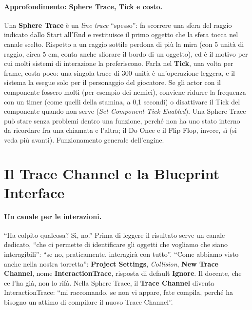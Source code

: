 \paragraph{Approfondimento: Sphere Trace, Tick e costo.} Una \textbf{Sphere Trace} è un
\emph{line trace} ``spesso'': fa scorrere una sfera del raggio indicato dallo Start
all'End e restituisce il primo oggetto che la sfera tocca nel canale scelto. Rispetto a un
raggio sottile perdona di più la mira (con 5 unità di raggio, circa 5 cm, conta anche
sfiorare il bordo di un oggetto), ed è il motivo per cui molti sistemi di interazione la
preferiscono. Farla nel \textbf{Tick}, una volta per frame, costa poco: una singola trace di
300 unità è un'operazione leggera, e il sistema la esegue solo per il personaggio del
giocatore. Se gli actor con il componente fossero molti (per esempio dei nemici), conviene
ridurre la frequenza con un timer (come quelli della stamina, a 0,1 secondi) o disattivare
il Tick del componente quando non serve (\emph{Set Component Tick Enabled}). Una Sphere
Trace può stare senza problemi dentro una funzione, perché non ha uno stato interno da
ricordare fra una chiamata e l'altra; il Do Once e il Flip Flop, invece, sì (si veda più
avanti). Funzionamento generale dell'engine.

\section{Il Trace Channel e la Blueprint Interface}
\label{ue12:sec:bpi}

\paragraph{Un canale per le interazioni.} ``Ha colpito qualcosa? Sì, no.'' Prima di
leggere il risultato serve un canale dedicato, ``che ci permette di identificare gli
oggetti che vogliamo che siano interagibili'': ``se no, praticamente, interagirà con
tutto''. ``Come abbiamo visto anche nella nostra torretta'': \textbf{Project Settings},
\emph{Collision}, \textbf{New Trace Channel}, nome \textbf{InteractionTrace}, risposta di
default \textbf{Ignore}. Il docente, che ce l'ha già, non lo rifà. Nella Sphere Trace, il
\textbf{Trace Channel} diventa InteractionTrace: ``mi raccomando, se non vi appare, fate
compila, perché ha bisogno un attimo di compilare il nuovo Trace Channel''.


